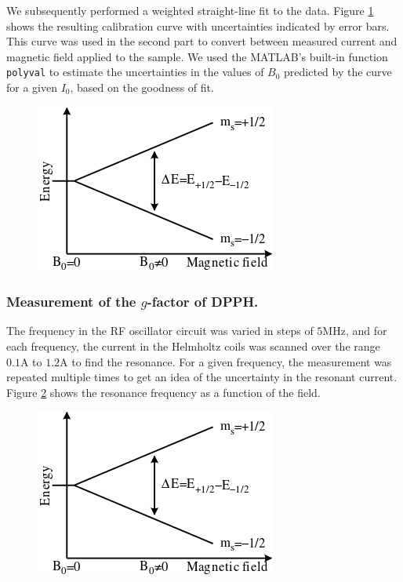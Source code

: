 \documentclass[a4paper]{jpconf}
\numberwithin{equation}{section}
\begin{document}
We subsequently performed a weighted straight-line fit to the data. Figure \ref{fig: HC calibration curve} shows the resulting calibration curve with uncertainties indicated by error bars. This curve was used in the second part to convert between measured current and magnetic field applied to the sample. We used the MATLAB's built-in function \texttt{polyval} to estimate the uncertainties in the values of $B_0$ predicted by the curve for a given $I_0$, based on the goodness of fit.

\begin{figure}[htbp]
	\includegraphics{EPR_splitting.png}
	\label{fig: HC calibration curve}
\end{figure}



\subsubsection{Measurement of the $g$-factor of DPPH.}
The frequency in the RF oscillator circuit was varied in steps of $5 \si{\mega\hertz}$, and for each frequency, the current in the Helmholtz coils was scanned over the range $0.1 \si{\ampere}$ to $1.2 \si{\ampere}$ to find the resonance. For a given frequency, the measurement was repeated multiple times to get an idea of the uncertainty in the resonant current. Figure \ref{fig: DPPH resonance} shows the resonance frequency as a function of the field.

\begin{figure}[htbp]
	\includegraphics{EPR_splitting.png}
	\label{fig: DPPH resonance}
\end{figure}
\end{document}

